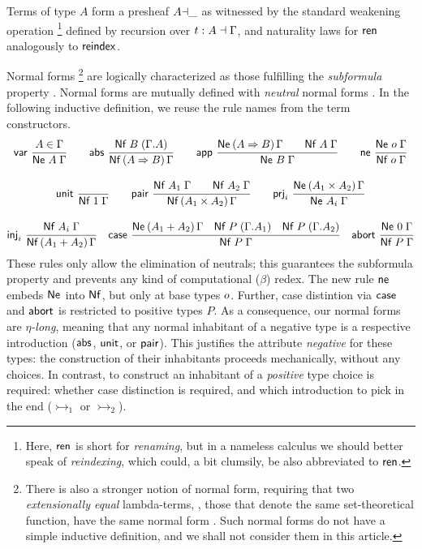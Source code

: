 \documentclass[a4paper,USenglish,cleveref, autoref]{lipics-v2019}
\begin{document}
Terms of type $A$ form a presheaf
$A{\dashv}\_$ as witnessed by the standard weakening operation%
\footnote{Here, $\mathsf{ren}$ is short for \emph{renaming}, but in a nameless
calculus we should better speak of \emph{reindexing}, which could, a
bit clumsily, be also abbreviated to $\mathsf{ren}$.}
defined by recursion over $t : A \dashv \Gamma$,
and naturality laws for $\mathsf{ren}$ analogously to $\mathsf{reindex}$.

Normal forms%
\footnote{%
There is also a stronger
notion of normal form, requiring that two \emph{extensionally equal}
lambda-terms, \ie, those that denote the
same set-theoretical function, have the same normal form
\cite{mitchell:foundations,altenkirchDybjerHofmannScott:lics01,scherer:popl17}.
Such normal forms do not have a simple inductive definition, and we
shall not consider them in this article.
}
are logically characterized as those fulfilling the
\emph{subformula} property \cite{prawitz:natded,matthes:shortproofs}.
Normal forms  are mutually defined with
\emph{neutral} normal forms .
In the following inductive definition, we reuse the rule names from the
term constructors.
\begin{gather*}
  \nru{\tvar}{A \in \Gamma}{\Ne A \Gamma}
\qquad
  \nru{\tabs}{\NfC B {\cext \Gamma A}}{\NfP {A \To B} \Gamma}
\qquad
  \nru{\tapp}
    {\NeP {A \To B} \Gamma \qquad \Nf A \Gamma}
    {\Ne B \Gamma}
\qquad
  \nru{\tne}{\Ne \tybase \Gamma}{\Nf \tybase \Gamma}
\\[2ex]
  \nru{\tunit}{}{\Nf \tyone \Gamma}
\qquad
  \nru{\tpair}
    {\Nf {A_1} \Gamma \qquad \Nf {A_2} \Gamma}
    {\NfP {A_1 \times A_2} \Gamma}
\qquad
  \nru{\tprj_i}
    {\NeP {A_1 \times A_2} \Gamma}
    {\Ne {A_i} \Gamma}
\\[2ex]
  \nru{\tinj_i}
    {\Nf {A_i} \Gamma}
    {\NfP {A_1 + A_2} \Gamma}
\quad
  \nru{\tcase}
    {\NeP {A_1 + A_2} \Gamma
      \quad \NfC P {\cext \Gamma A_1}
      \quad \NfC P {\cext \Gamma A_2}
    }{\Nf P \Gamma}
\quad
  \nru{\tabort}
    {\Ne \tyzero \Gamma}
    {\Nf P \Gamma}
\end{gather*}
These rules only allow the elimination of neutrals; this guarantees
the subformula property and prevents any kind of computational
($\beta$) redex.
The new rule $\mathsf{ne}$ embeds $\mathsf{Ne}^{}$ into $\mathsf{Nf}$,
but only at base types $o$.
Further, case distintion via $\mathsf{case}$ and $\mathsf{abort}$
is restricted to positive types $P$.
As a consequence, our normal forms are
\emph{$\eta$-long}, meaning that any normal inhabitant of a negative
type is a respective introduction ($\mathsf{abs}$, $\mathsf{unit}$, or $\mathsf{pair}$).
This justifies the attribute \emph{negative} for these types:
the construction of their inhabitants proceeds mechanically, without
any choices.  In contrast, to construct an inhabitant of a
\emph{positive} type choice is required: whether case distinction is
required, and which introduction to pick in the end ($\tinj_1$ or $\tinj_2$).
\end{document}
